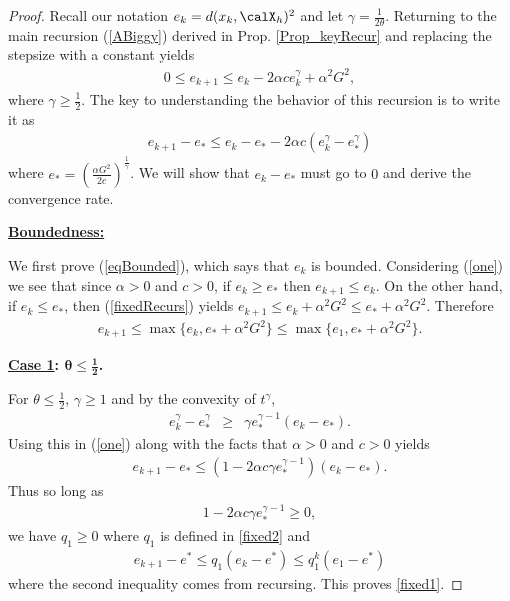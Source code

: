 \begin{proof}
 Recall our notation $e_k=d(x_k,\calX_h)^2$ and let $\gamma=\frac{1}{2\theta}$. 
 Returning to the main recursion (\ref{ABiggy}) derived in Prop. \ref{Prop_keyRecur} and replacing the stepsize with a constant yields
 \begin{eqnarray}\label{fixedRecurs}
 0\leq e_{k+1}\leq e_k - 2\alpha c e_k^\gamma + \alpha^2 G^2,
 \end{eqnarray}
 where $\gamma\geq \frac{1}{2}$. 
  The key to understanding the behavior of this recursion is to write it as
 \begin{eqnarray}
 e_{k+1}-e_*\leq e_k - e_* - 2\alpha c (e_k^\gamma - e_*^\gamma)\label{one}
 \end{eqnarray}
 where $e_* = \left(\frac{\alpha G^2}{2c}\right)^{\frac{1}{\gamma}}$.
  We will show that $e_k - e_*$ must go to $0$ and derive the convergence rate.

 
 \noindent
 {\bf \underline{Boundedness:}}

 \noindent 
 We first prove (\ref{eqBounded}), which says that $e_k$ is bounded. Considering (\ref{one}) we see that since $\alpha>0$ and $c>0$, if $e_k\geq e_*$ then $e_{k+1}\leq e_k$. On the other hand, if $e_k\leq e_*$, then (\ref{fixedRecurs}) yields $e_{k+1}\leq e_k+\alpha^2 G^2\leq e_*+\alpha^2 G^2$. Therefore
 \begin{eqnarray*}
 e_{k+1}\leq\max\{e_k,e_*+\alpha^2 G^2\}\leq\max\{e_1,e_*+\alpha^2 G^2\}.
 \end{eqnarray*}
 
 \noindent
 {\bf\underline{Case 1}: $\boldsymbol{\theta\leq\frac{1}{2}}$.}
 
 \noindent
 For $\theta\leq\frac{1}{2}$, $\gamma\geq 1$ and by the convexity of $t^\gamma$,
 \begin{eqnarray*}
 e_k^\gamma - e_*^\gamma &\geq& \gamma e_*^{\gamma-1}(e_k-e_*).
 \end{eqnarray*}
 Using this in (\ref{one}) along with the facts that $\alpha>0$ and $c>0$ yields 
 \begin{eqnarray*}
 e_{k+1}-e_*\leq  (1-2\alpha c\gamma e_*^{\gamma-1})(e_k - e_*).
 \end{eqnarray*}
 Thus so long as 
 \begin{eqnarray}
 1-2\alpha c\gamma e_*^{\gamma-1}\geq 0,\label{two}
 \end{eqnarray}
 we have $q_1\geq 0$ where $q_1$ is defined in \eqref{fixed2} and
 \begin{align*}
 e_{k+1}-e^*\leq q_1(e_k - e^*)
 \leq
 q_1^k(e_1 - e^*)
 \end{align*}
where the second inequality comes from recursing. This proves \eqref{fixed1}.


\end{proof}
